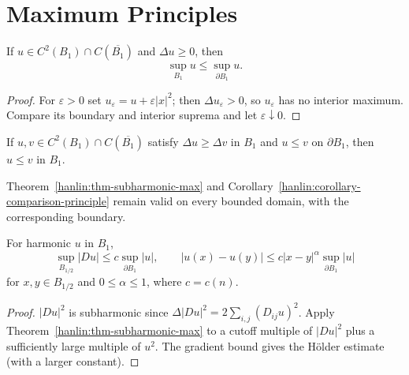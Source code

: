 \section{Maximum Principles}

\begin{theorem}\label{hanlin:thm-subharmonic-max}


If $u\in C^2(B_1)\cap C(\overline{B_1})$ and $\Delta u\ge0$, then
\[
\sup_{B_1}u\le\sup_{\partial B_1}u.
\]
\end{theorem}
\begin{proof}
\sketch For $\varepsilon>0$ set $u_\varepsilon=u+\varepsilon|x|^2$; then
$\Delta u_\varepsilon>0$, so $u_\varepsilon$ has no interior maximum. Compare
its boundary and interior suprema and let $\varepsilon\downarrow0$.
\end{proof}

\begin{corollary}\label{hanlin:corollary-comparison-principle}


If $u,v\in C^2(B_1)\cap C(\overline{B_1})$ satisfy $\Delta u\ge\Delta v$ in
$B_1$ and $u\le v$ on $\partial B_1$, then $u\le v$ in $B_1$.
\end{corollary}

\begin{remark}\label{hanlin:remark-maxprin-domain}
Theorem~\ref{hanlin:thm-subharmonic-max} and Corollary~\ref{hanlin:corollary-comparison-principle}
remain valid on every bounded domain, with the corresponding boundary.
\end{remark}

\begin{theorem}\label{hanlin:thm-interior-gradient}
For harmonic $u$ in $B_1$,
\[
\sup_{B_{1/2}}|Du|\le c\sup_{\partial B_1}|u|,
\qquad
|u(x)-u(y)|\le c|x-y|^\alpha\sup_{\partial B_1}|u|
\]
for $x,y\in B_{1/2}$ and $0\le\alpha\le1$, where $c=c(n)$.
\end{theorem}
\begin{proof}
\sketch $|Du|^2$ is subharmonic since
$\Delta|Du|^2=2\sum_{i,j}(D_{ij}u)^2$. Apply Theorem~\ref{hanlin:thm-subharmonic-max}
to a cutoff multiple of $|Du|^2$ plus a sufficiently large multiple of $u^2$.
The gradient bound gives the Hölder estimate (with a larger constant).
\end{proof}

